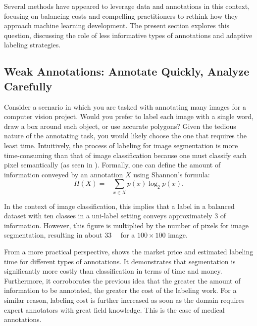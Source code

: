Several methods have appeared to leverage data and annotations in this context, focusing on balancing costs and compelling practitioners to rethink how they approach machine learning development. The present section explores this question, discussing the role of less informative types of annotations and adaptive labeling strategies.

\subsection{Weak Annotations: Annotate Quickly, Analyze Carefully}
Consider a scenario in which you are tasked with annotating many images for a computer vision project. Would you prefer to label each image with a single word, draw a box around each object, or use accurate polygons? Given the tedious nature of the annotating task, you would likely choose the one that requires the least time. Intuitively, the process of labeling for image segmentation is more time-consuming than that of image classification because one must classify each pixel semantically (as seen in ). Formally, one can define the amount of information conveyed by an annotation $X$ using Shannon's formula:
\begin{equation}
    H(X)=-\sum_{x\in X} p(x)\log_2 p(x).
\end{equation}

In the context of image classification, this implies that a label in a balanced dataset with ten classes in a uni-label setting conveys approximately \qty{3}{\bit} of information. However, this figure is multiplied by the number of pixels for image segmentation, resulting in about \qty{33}{\kilo\bit} for a $100\times 100$ image.

From a more practical perspective,  shows the market price and estimated labeling time for different types of annotations. It demonstrates that segmentation is significantly more costly than classification in terms of time and money. Furthermore, it corroborates the previous idea that the greater the amount of information to be annotated, the greater the cost of the labeling work. For a similar reason, labeling cost is further increased as soon as the domain requires expert annotators with great field knowledge. This is the case of medical annotations.

